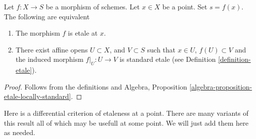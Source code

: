 \begin{lemma}
\label{lemma-etale-locally-standard-etale}
Let $f : X  \to S$ be a morphism of schemes.
Let $x \in X$ be a point.
Set $s = f(x)$.
The following are equivalent
\begin{enumerate}
\item The morphism $f$ is etale at $x$.
\item There exist affine opens $U \subset X$,
and $V \subset S$ such that $x \in U$, $f(U) \subset V$ and the
induced morphism $f|_U : U \to V$ is standard etale
(see Definition \ref{definition-etale}).
\end{enumerate}
\end{lemma}

\begin{proof}
Follows from the definitions and
Algebra, Proposition \ref{algebra-proposition-etale-locally-standard}.
\end{proof}

\noindent
Here is a differential criterion of etaleness at a point.
There are many variants of this result
all of which may be usefull at some point. We will just add them
here as needed.

